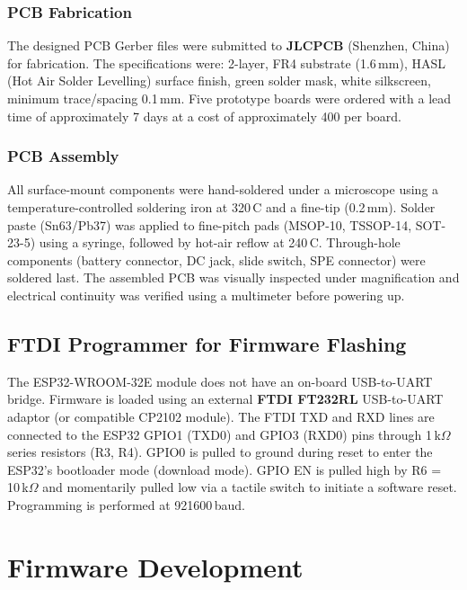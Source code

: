 \subsubsection{PCB Fabrication}

The designed PCB Gerber files were submitted to \textbf{JLCPCB} (Shenzhen, China) for fabrication. The specifications were: 2-layer, FR4 substrate (1.6\,mm), HASL (Hot Air Solder Levelling) surface finish, green solder mask, white silkscreen, minimum trace/spacing 0.1\,mm. Five prototype boards were ordered with a lead time of approximately 7 days at a cost of approximately \rupee{}400 per board.

\subsubsection{PCB Assembly}

All surface-mount components were hand-soldered under a microscope using a temperature-controlled soldering iron at 320\,\textdegree{}C and a fine-tip (0.2\,mm). Solder paste (Sn63/Pb37) was applied to fine-pitch pads (MSOP-10, TSSOP-14, SOT-23-5) using a syringe, followed by hot-air reflow at 240\,\textdegree{}C. Through-hole components (battery connector, DC jack, slide switch, SPE connector) were soldered last. The assembled PCB was visually inspected under magnification and electrical continuity was verified using a multimeter before powering up.

\subsection{FTDI Programmer for Firmware Flashing}
\label{subsec:ftdi}

The ESP32-WROOM-32E module does not have an on-board USB-to-UART bridge. Firmware is loaded using an external \textbf{FTDI FT232RL} USB-to-UART adaptor (or compatible CP2102 module). The FTDI TXD and RXD lines are connected to the ESP32 GPIO1 (TXD0) and GPIO3 (RXD0) pins through 1\,k$\Omega$ series resistors (R3, R4). GPIO0 is pulled to ground during reset to enter the ESP32's bootloader mode (download mode). GPIO EN is pulled high by R6 = 10\,k$\Omega$ and momentarily pulled low via a tactile switch to initiate a software reset. Programming is performed at 921600\,baud.

\section{Firmware Development}
\label{sec:firmware}


